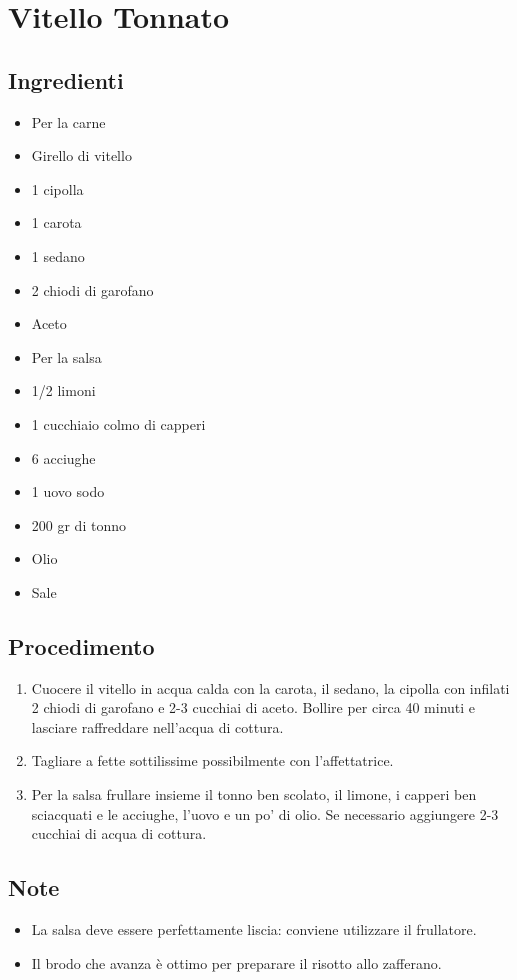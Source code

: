\section{Vitello Tonnato}
\subsection{Ingredienti}
\begin{itemize}
\item Per la carne  
\item Girello di vitello  
\item 1 cipolla  
\item 1 carota  
\item 1 sedano  
\item 2 chiodi di garofano  
\item Aceto  
\item Per la salsa  
\item 1/2 limoni  
\item 1 cucchiaio colmo di capperi  
\item 6 acciughe   
\item 1 uovo sodo  
\item 200 gr di tonno  
\item Olio  
\item Sale
\end{itemize}
\subsection{Procedimento}
\begin{enumerate}
\item  Cuocere il vitello in acqua calda con la carota, il sedano, la cipolla con infilati 2 chiodi di garofano e 2-3 cucchiai di aceto. Bollire per circa 40 minuti e lasciare raffreddare nell'acqua di cottura.  
\item  Tagliare a fette sottilissime possibilmente con l'affettatrice.  
\item  Per la salsa frullare insieme il tonno ben scolato, il limone, i capperi ben sciacquati e le acciughe, l'uovo e un po' di olio. Se necessario aggiungere 2-3 cucchiai di acqua di cottura.
\end{enumerate}
\subsection{Note}
\begin{itemize}
\item La salsa deve essere perfettamente liscia: conviene utilizzare il frullatore.  
\item Il brodo che avanza è ottimo per preparare il risotto allo zafferano.
\end{itemize}
